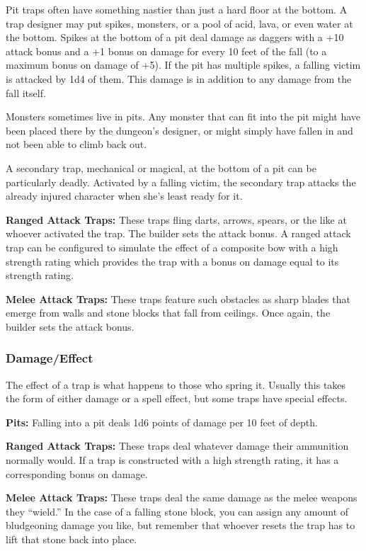 Pit traps often have something nastier than just a hard floor at the bottom. A trap designer may put spikes, monsters, or a pool of acid, lava, or even water at the bottom. Spikes at the bottom of a pit deal damage as daggers with a +10 attack bonus and a +1 bonus on damage for every 10 feet of the fall (to a maximum bonus on damage of +5). If the pit has multiple spikes, a falling victim is attacked by 1d4 of them. This damage is in addition to any damage from the fall itself.

Monsters sometimes live in pits. Any monster that can fit into the pit might have been placed there by the dungeon's designer, or might simply have fallen in and not been able to climb back out.

A secondary trap, mechanical or magical, at the bottom of a pit can be particularly deadly. Activated by a falling victim, the secondary trap attacks the already injured character when she's least ready for it.

\textbf{Ranged Attack Traps:} These traps fling darts, arrows, spears, or the like at whoever activated the trap. The builder sets the attack bonus. A ranged attack trap can be configured to simulate the effect of a composite bow with a high strength rating which provides the trap with a bonus on damage equal to its strength rating.

\textbf{Melee Attack Traps:} These traps feature such obstacles as sharp blades that emerge from walls and stone blocks that fall from ceilings. Once again, the builder sets the attack bonus.

\subsubsection{Damage/Effect}
The effect of a trap is what happens to those who spring it. Usually this takes the form of either damage or a spell effect, but some traps have special effects.

\textbf{Pits:} Falling into a pit deals 1d6 points of damage per 10 feet of depth.

\textbf{Ranged Attack Traps:} These traps deal whatever damage their ammunition normally would. If a trap is constructed with a high strength rating, it has a corresponding bonus on damage.

\textbf{Melee Attack Traps:} These traps deal the same damage as the melee weapons they ``wield.'' In the case of a falling stone block, you can assign any amount of bludgeoning damage you like, but remember that whoever resets the trap has to lift that stone back into place.

